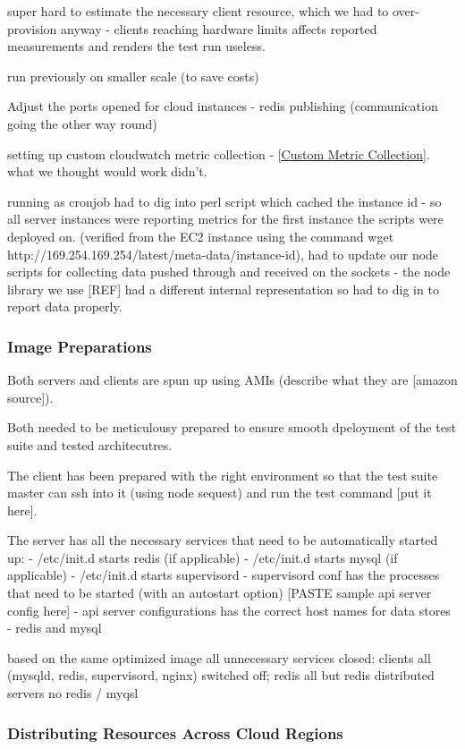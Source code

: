 \documentclass{uvamscse}
\begin{document}
super hard to estimate the necessary client resource, which we had to over-provision anyway - clients reaching hardware limits affects reported measurements and renders the test run useless.

run previously on smaller scale (to save costs)

Adjust the ports opened for cloud instances - redis publishing (communication going the other way round)

setting up custom cloudwatch metric collection - \ref{Custom Metric Collection}. what we thought would work didn't.

running as cronjob
had to dig into perl script which cached the instance id - so all server instances were reporting metrics for the first instance the scripts were deployed on. (verified from the EC2 instance using the command wget http://169.254.169.254/latest/meta-data/instance-id),
had to update our node scripts for collecting data pushed through and received on the sockets - the node library we use [REF] had a different internal representation so had to dig in to report data properly.

\subsubsection{Image Preparations}
Both servers and clients are spun up using AMIs (describe what they are [amazon source]).

Both needed to be meticulousy prepared to ensure smooth dpeloyment of the test suite and tested architecutres.

The client has been prepared with the right environment so that the test suite master can ssh into it (using node sequest) and run the test command [put it here].

The server has all the necessary services that need to be automatically started up:
- /etc/init.d starts redis (if applicable)
- /etc/init.d starts mysql (if applicable)
- /etc/init.d starts supervisord
    - supervisord conf has the processes that need to be started (with an autostart option) [PASTE sample api server config here]
- api server configurations has the correct host names for data stores - redis and mysql

based on the same optimized image all unnecessary services closed: 
clients all (mysqld, redis, supervisord, nginx) switched off; redis all but redis 
distributed servers no redis / myqsl

\subsubsection{Distributing Resources Across Cloud Regions}
\end{document}

